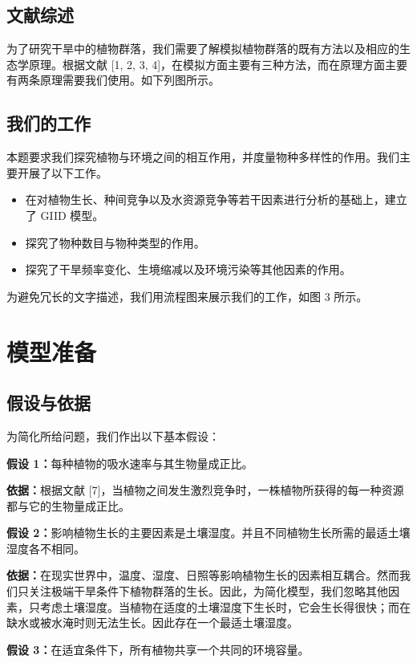 \documentclass[11pt,a4paper]{ctexart}
\begin{document}
\subsection{文献综述}

为了研究干旱中的植物群落，我们需要了解模拟植物群落的既有方法以及相应的生态学原理。根据文献 [1, 2, 3, 4]，在模拟方面主要有三种方法，而在原理方面主要有两条原理需要我们使用。如下列图所示。

\subsection{我们的工作}

本题要求我们探究植物与环境之间的相互作用，并度量物种多样性的作用。我们主要开展了以下工作。

\begin{itemize}
\item 在对植物生长、种间竞争以及水资源竞争等若干因素进行分析的基础上，建立了 GIID 模型。
\item 探究了物种数目与物种类型的作用。
\item 探究了干旱频率变化、生境缩减以及环境污染等其他因素的作用。
\end{itemize}

为避免冗长的文字描述，我们用流程图来展示我们的工作，如图 3 所示。

\section{模型准备}

\subsection{假设与依据}

为简化所给问题，我们作出以下基本假设：

\textbf{假设 1：}每种植物的吸水速率与其生物量成正比。

\textbf{依据：}根据文献 [7]，当植物之间发生激烈竞争时，一株植物所获得的每一种资源都与它的生物量成正比。

\textbf{假设 2：}影响植物生长的主要因素是土壤湿度。并且不同植物生长所需的最适土壤湿度各不相同。

\textbf{依据：}在现实世界中，温度、湿度、日照等影响植物生长的因素相互耦合。然而我们只关注极端干旱条件下植物群落的生长。因此，为简化模型，我们忽略其他因素，只考虑土壤湿度。当植物在适度的土壤湿度下生长时，它会生长得很快；而在缺水或被水淹时则无法生长。因此存在一个最适土壤湿度。

\textbf{假设 3：}在适宜条件下，所有植物共享一个共同的环境容量。
\end{document}
